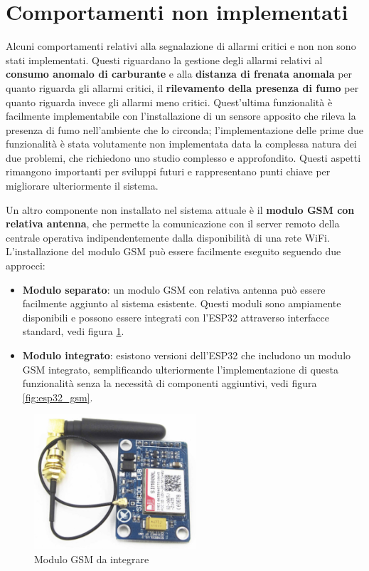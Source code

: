 \documentclass[12pt, a4paper, italian]{report}
\numberwithin{figure}{chapter}
\numberwithin{table}{chapter}
\begin{document}
\section{Comportamenti non implementati}
Alcuni comportamenti relativi alla segnalazione di allarmi critici e non non sono stati implementati. Questi riguardano la gestione degli allarmi relativi al \textbf{consumo anomalo di carburante} e alla \textbf{distanza di frenata anomala} per quanto riguarda gli allarmi critici, il \textbf{rilevamento della presenza di fumo} per quanto riguarda invece gli allarmi meno critici. Quest'ultima funzionalità è facilmente implementabile con l'installazione di un sensore apposito che rileva la presenza di fumo nell'ambiente che lo circonda; l'implementazione delle prime due funzionalità è stata volutamente non implementata data la complessa natura dei due problemi, che richiedono uno studio complesso e approfondito. Questi aspetti rimangono importanti per sviluppi futuri e rappresentano punti chiave per migliorare ulteriormente il sistema.

Un altro componente non installato nel sistema attuale è il \textbf{modulo GSM con relativa antenna}, che permette la comunicazione con il server remoto della centrale operativa indipendentemente dalla disponibilità di una rete WiFi.
L'installazione del modulo GSM può essere facilmente eseguito seguendo due approcci: 

\begin{itemize}
    \item \textbf{Modulo separato}: un modulo GSM con relativa antenna può essere facilmente aggiunto al sistema esistente. Questi moduli sono ampiamente disponibili e possono essere integrati con l'ESP32 attraverso interfacce standard, vedi figura  \ref{fig:modulo_gsm}.
    \item \textbf{Modulo integrato}: esistono versioni dell'ESP32 che includono un modulo GSM integrato, semplificando ulteriormente l'implementazione di questa funzionalità senza la necessità di componenti aggiuntivi, vedi figura \ref{fig:esp32_gsm}.
\end{itemize}

\begin{figure}[h]
  \centering
  \includegraphics[width=6cm]{gsm_module.png}
  \caption{Modulo GSM da integrare}
  \label{fig:modulo_gsm}
\end{figure}
\end{document}
